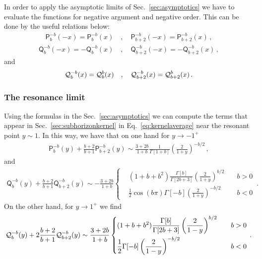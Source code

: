 \documentclass[a4paper,11pt]{article}
\numberwithin{equation}{section}
\begin{document}
In order to apply the asymptotic limits of Sec.~\ref{sec:asymptotics} we have to evaluate the functions for negative argument and negative order. This can be done by the useful relations below:
\begin{align}
\mathsf{P}^{-b}_{b}(-x)=\mathsf{P}^{-b}_{b}(x)\quad,\quad \mathsf{P}^{-b}_{b+2}(-x)=\mathsf{P}^{-b}_{b+2}(x)\,,
\end{align}
\begin{align}
\mathsf{Q}^{-b}_{b}(-x)=-\mathsf{Q}^{-b}_{b}(x)\quad,\quad \mathsf{Q}^{-b}_{b+2}(-x)=-\mathsf{Q}^{-b}_{b+2}(x)\,,
\end{align}
and
\begin{align}
{\cal Q}^{-b}_{b}(x)={\cal Q}^{b}_{b}(x)\quad,\quad {\cal Q}^{-b}_{b+2}(x)={\cal Q}^{b}_{b+2}(x)\,.
\end{align}

\subsubsection{The resonance limit}
Using the formulas in the Sec.~\ref{sec:asymptotics} we can compute the terms that appear in Sec.~\ref{sec:subhorizonkernel} in Eq.~\ref{eq:kernelaverage} near the resonant point $y\sim1$. In this way, we have that on one hand for $y\to -1^+$
\begin{align}
\mathsf{P}^{-b}_{b}(y)+\frac{b+2}{b+1}\mathsf{P}^{-b}_{b+2}(y)\sim\frac{3+2b}{1+b}\frac{1}{\Gamma[1+b]}\left(\frac{2}{1+y}\right)^{-b/2}\,,
\end{align}
and
\begin{align}
\mathsf{Q}^{-b}_{b}(y)+\frac{b+2}{b+1}\mathsf{Q}^{-b}_{b+2}(y)\sim-\frac{3+2b}{1+b}\left\{
\begin{aligned}
&(1+b+b^2)\frac{\Gamma[b]}{\Gamma[2b+3]}\left(\frac{2}{1+y}\right)^{b/2}\quad &b>0\\
&\frac{1}{2}\cos(b\pi)\Gamma[-b]\left(\frac{2}{1+y}\right)^{-b/2}\quad &b<0
\end{aligned}
\right.\,.
\end{align}
On the other hand, for $y\to 1^+$ we find
\begin{align}
{\cal Q}^{-b}_{b}(y)+2\frac{b+2}{b+1}{\cal Q}^{-b}_{b+2}(y)\sim\frac{3+2b}{1+b}\left\{
\begin{aligned}
&(1+b+b^2)\frac{\Gamma[b]}{\Gamma[2b+3]}\left(\frac{2}{1-y}\right)^{b/2}\quad &b>0\\
&\frac{1}{2}\Gamma[-b]\left(\frac{2}{1-y}\right)^{-b/2}\quad &b<0
\end{aligned}
\right.\,.
\end{align}




\end{document}
